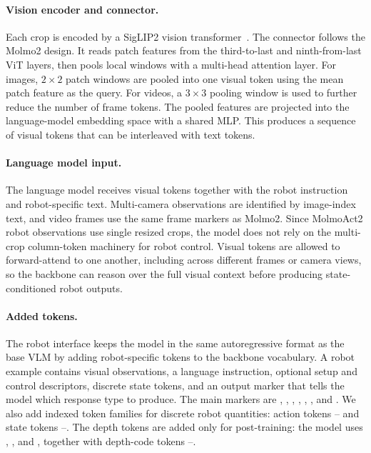 \paragraph{Vision encoder and connector.}
Each crop is encoded by a SigLIP2 vision transformer~\citep{tschannen2025siglip}.
The connector follows the Molmo2 design. It reads patch features from the
third-to-last and ninth-from-last ViT layers, then pools local windows with a
multi-head attention layer. For images, \(2\times2\) patch windows are pooled
into one visual token using the mean patch feature as the query. For videos, a
\(3\times3\) pooling window is used to further reduce the number of frame
tokens. The pooled features are projected into the language-model embedding
space with a shared MLP. This produces a sequence of visual tokens that can be
interleaved with text tokens.

\paragraph{Language model input.}
The language model receives visual tokens together with the robot instruction
and robot-specific text. Multi-camera observations are identified by image-index
text, and video frames use the same frame markers as Molmo2. Since MolmoAct2
robot observations use single resized crops, the model does not rely on the
multi-crop column-token machinery for robot control. Visual tokens are allowed
to forward-attend to one another, including across different frames or camera
views, so the backbone can reason over the full visual context before producing
state-conditioned robot outputs.

\paragraph{Added tokens.}
The robot interface keeps the model in the same autoregressive format as the
base VLM by adding robot-specific tokens to the backbone vocabulary. A robot
example contains visual observations, a language instruction, optional setup
and control descriptors, discrete state tokens, and an output marker that tells
the model which response type to produce. The main markers are
\texttt{}, \texttt{},
\texttt{}, \texttt{},
\texttt{}, \texttt{}, and
\texttt{}. We also add indexed token families for
discrete robot quantities: action tokens
\texttt{}--\texttt{} and
state tokens
\texttt{}--\texttt{}. The
depth tokens are added only for \molmothink post-training: the model uses
\texttt{}, \texttt{}, and
\texttt{}, together with depth-code tokens
\texttt{}--\texttt{}.

